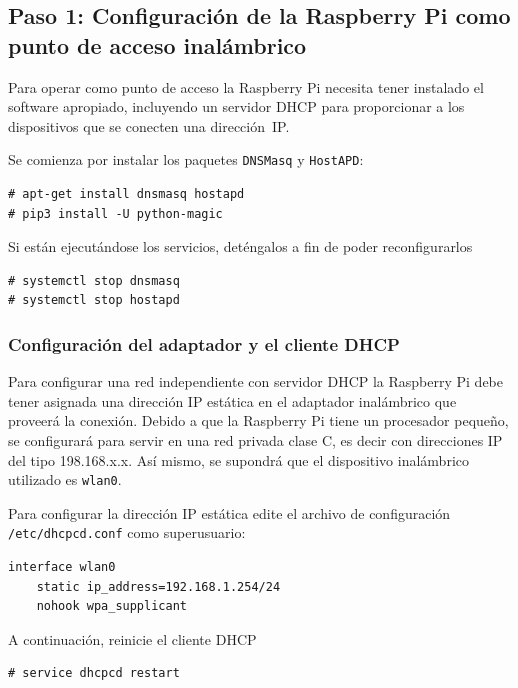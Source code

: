 \documentclass[letterpaper,10.5pt]{article}
\begin{document}
%
%
\subsection{Paso 1: Configuración de la Raspberry Pi como punto de acceso inalámbrico}%
\label{sec:ap}


Para operar como punto de acceso la Raspberry Pi necesita tener instalado el software apropiado, incluyendo un servidor DHCP para proporcionar a los dispositivos que se conecten una dirección~IP. %

Se comienza por instalar los paquetes \texttt{DNSMasq} y \texttt{HostAPD}:

\begin{Verbatim}
# apt-get install dnsmasq hostapd
# pip3 install -U python-magic
\end{Verbatim}

Si están ejecutándose los servicios, deténgalos a fin de poder reconfigurarlos
\begin{Verbatim}
# systemctl stop dnsmasq
# systemctl stop hostapd
\end{Verbatim}

\subsubsection{Configuración del adaptador y el cliente DHCP}%
\label{sec:ap-adapter}

Para configurar una red independiente con servidor DHCP la Raspberry Pi debe tener asignada una dirección IP estática en el adaptador inalámbrico que proveerá la conexión.
Debido a que la Raspberry Pi tiene un procesador pequeño, se configurará para servir en una red privada clase C, es decir con direcciones IP del tipo 198.168.x.x.
Así mismo, se supondrá que el dispositivo inalámbrico utilizado es \texttt{wlan0}.

Para configurar la dirección IP estática edite el archivo de configuración \texttt{/etc/dhcpcd.conf} como superusuario:

\begin{Verbatim}
interface wlan0
    static ip_address=192.168.1.254/24
    nohook wpa_supplicant
\end{Verbatim}

A continuación, reinicie el cliente DHCP

\begin{Verbatim}
# service dhcpcd restart
\end{Verbatim}
\end{document}
